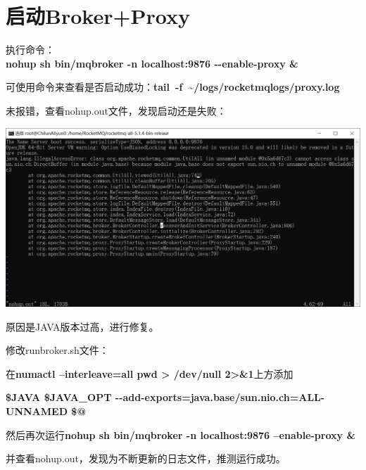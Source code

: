 \documentclass[11pt, a4paper, oneside, fontset=none]{ctexbook}
\begin{document}
\section{启动Broker+Proxy}
执行命令：\\{\bfseries\kaishu nohup sh bin/mqbroker -n localhost:9876 -{}-enable-proxy \&}

可使用命令来查看是否启动成功：{\bfseries\kaishu tail\  -f\ \textasciitilde/logs/rocketmqlogs/proxy.log}

未报错，查看nohup.out文件，发现启动还是失败：
\begin{center}
  \begin{minipage}{\textwidth}
    \center
    \includegraphics[width=\textwidth]{picture/broker启动失败.png}
    \captionsetup{hypcap=false}
    \label{fig:broker启动失败}
  \end{minipage}
\end{center}

原因是JAVA版本过高，进行修复。

修改runbroker.sh文件：

在{\bfseries\kaishu numactl --interleave=all pwd > /dev/null 2>\&1}上方添加

{\bfseries\kaishu \$JAVA \${JAVA\_OPT} {-}{-}add-exports=java.base/sun.nio.ch=ALL-UNNAMED \$@}


然后再次运行{\bfseries\kaishu nohup sh bin/mqbroker -n localhost:9876 –enable-proxy \&}

并查看nohup.out，发现为不断更新的日志文件，推测运行成功。
\end{document}
